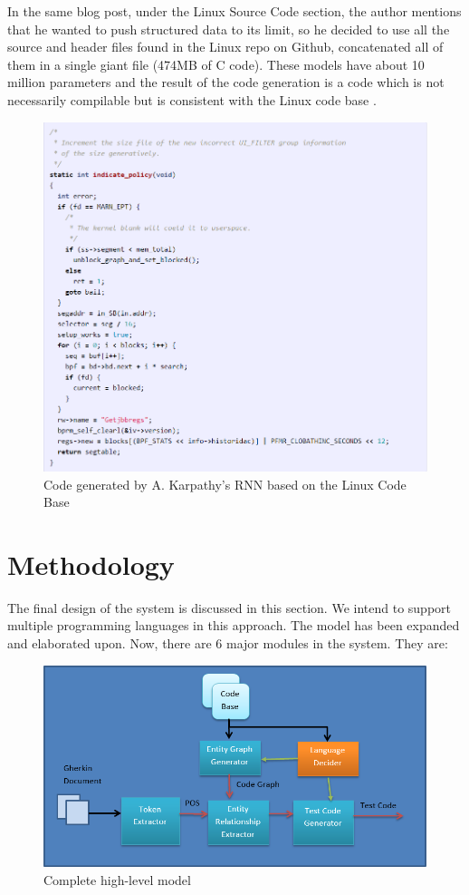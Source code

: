 \documentclass[conference, onecolumn, a4, 12pt]{IEEEtran}
\begin{document}
In the same blog post, under the Linux Source Code section, the author mentions that he wanted to push structured data to its limit, so he decided to use all the source and header files found in the Linux repo on Github, concatenated all of them in a single giant file (474MB of C code). These models have about 10 million parameters and the result of the code generation is a code which is not necessarily compilable but is consistent with the Linux code base \cite{a11}.

\begin{figure}
	\centering
	\includegraphics[width=0.7\linewidth]{Karpathy_gen_code}
	\caption{Code generated by A. Karpathy's RNN based on the Linux Code Base}
	\label{fig:karpathygencode}
\end{figure}


\section{Methodology}
The final design of the system is discussed in this section. We intend to support multiple programming languages in this approach. The model has been expanded and elaborated upon. Now, there are 6 major modules in the system. They are:

\begin{figure}
	\includegraphics[width=\linewidth]{Complete_high_level_modules.png}
	\caption{Complete high-level model}
	\label{fig14}
\end{figure}
\end{document}

